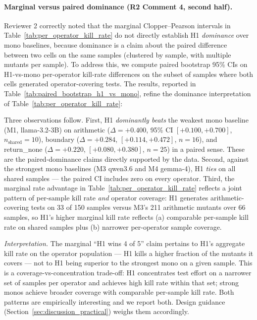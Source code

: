 \paragraph{Marginal versus paired dominance (R2 Comment 4, second half).}
Reviewer 2 correctly noted that the marginal Clopper--Pearson intervals in Table~\ref{tab:per_operator_kill_rate} do not directly establish H1 \emph{dominance} over mono baselines, because dominance is a claim about the paired difference between two cells on the same samples (clustered by sample, with multiple mutants per sample). To address this, we compute paired bootstrap 95\% CIs on H1-vs-mono per-operator kill-rate differences on the subset of samples where both cells generated operator-covering tests. The results, reported in Table~\ref{tab:paired_bootstrap_h1_vs_mono}, refine the dominance interpretation of Table~\ref{tab:per_operator_kill_rate}:



Three observations follow. First, H1 \emph{dominantly beats} the weakest mono baseline (M1, llama-3.2-3B) on arithmetic ($\Delta = +0.400$, 95\% CI $[+0.100, +0.700]$, $n_{\text{shared}} = 10$), boundary ($\Delta = +0.284$, $[+0.114, +0.472]$, $n = 16$), and return\_none ($\Delta = +0.220$, $[+0.080, +0.380]$, $n = 25$) in a paired sense. These are the paired-dominance claims directly supported by the data. Second, against the strongest mono baselines (M3 qwen3.6 and M4 gemma-4), H1 \emph{ties} on all shared samples --- the paired CI includes zero on every operator. Third, the marginal rate advantage in Table~\ref{tab:per_operator_kill_rate} reflects a joint pattern of per-sample kill rate \emph{and} operator coverage: H1 generates arithmetic-covering tests on 33 of 150 samples versus M3's 211 arithmetic mutants over 66 samples, so H1's higher marginal kill rate reflects (a) comparable per-sample kill rate on shared samples plus (b) narrower per-operator sample coverage.

\emph{Interpretation.} The marginal ``H1 wins 4 of 5'' claim pertains to H1's aggregate kill rate on the operator population --- H1 kills a higher fraction of the mutants it covers --- not to H1 being superior to the strongest mono on a given sample. This is a coverage-vs-concentration trade-off: H1 concentrates test effort on a narrower set of samples per operator and achieves high kill rate within that set; strong monos achieve broader coverage with comparable per-sample kill rate. Both patterns are empirically interesting and we report both. Design guidance (Section~\ref{sec:discussion_practical}) weighs them accordingly.

